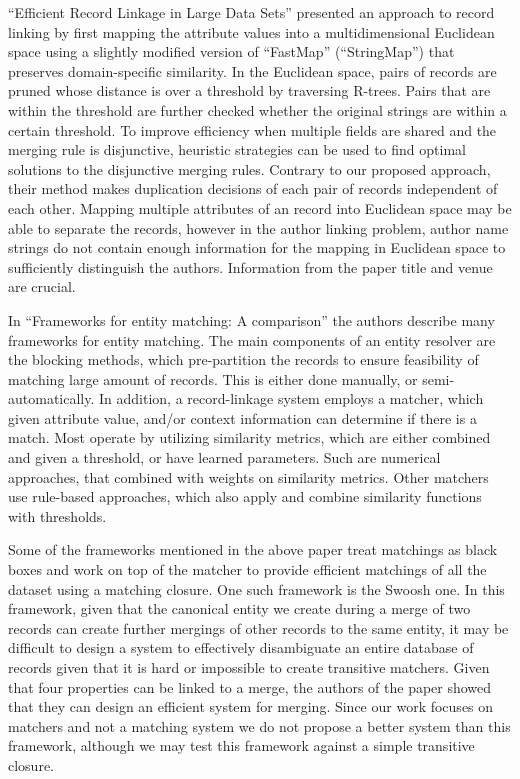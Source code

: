\documentclass[]{article}
\begin{document}
``Efficient Record Linkage in Large Data Sets'' \cite{Jin2003} presented an approach to record linking by first mapping the attribute values into a multidimensional Euclidean space using a slightly modified version of ``FastMap'' (``StringMap'') that preserves domain-specific similarity.  In the Euclidean space, pairs of records are pruned whose distance is over a threshold by traversing R-trees.  Pairs that are within the threshold are further checked whether the original strings are within a certain threshold.  To improve efficiency when multiple fields are shared and the merging rule is disjunctive, heuristic strategies can be used to find optimal solutions to the disjunctive merging rules.  Contrary to our proposed approach, their method makes duplication decisions of each pair of records independent of each other.  Mapping multiple attributes of an record into Euclidean space may be able to separate the records, however in the author linking problem, author name strings do not contain enough information for the mapping in Euclidean space to sufficiently distinguish the authors.  Information from the paper title and venue are crucial.

In ``Frameworks for entity matching: A comparison'' \cite{kopcke2010frameworks} the authors describe many frameworks for entity matching. The main components of an entity resolver are the blocking methods, which pre-partition the records to ensure feasibility of matching large amount of records. This is either done manually, or semi-automatically. In addition, a record-linkage system employs a matcher, which given attribute value, and/or context information can determine if there is a match. Most operate by utilizing similarity metrics, which are either combined and given a threshold, or have learned parameters. Such are numerical approaches, that combined with weights on similarity metrics. Other matchers use rule-based approaches, which also apply and combine similarity functions with thresholds.

Some of the frameworks mentioned in the above paper treat matchings as black boxes and work on top of the matcher to provide efficient matchings of all the dataset using a matching closure. One such framework is the Swoosh \cite{benjelloun2009swoosh} one. In this framework, given that the canonical entity we create during a merge of two records can create further mergings of other records to the same entity, it may be difficult to design a system to effectively disambiguate an entire database of records given that it is hard or impossible to create transitive matchers. Given that four properties can be linked to a merge, the authors of the paper showed that they can design an efficient system for merging. Since our work focuses on matchers and not a matching system we do not propose a better system than this framework, although we may test this framework against a simple transitive closure.
\end{document}
